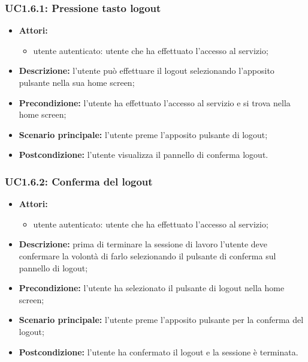 \subsubsection{UC1.6.1: Pressione tasto logout}
\begin{itemize}
	\item \textbf{Attori:}
	\begin{itemize}
		\item utente autenticato: utente che ha effettuato l'accesso al servizio;
	\end{itemize}
	\item \textbf{Descrizione:} l'utente può effettuare il logout selezionando l'apposito pulsante nella sua home screen;
	\item \textbf{Precondizione:} l'utente ha effettuato l'accesso al servizio e si trova nella home screen;
	\item \textbf{Scenario principale:} l'utente preme l'apposito pulsante di logout;
	\item \textbf{Postcondizione:} l'utente visualizza il pannello di conferma logout.
\end{itemize}

\subsubsection{UC1.6.2: Conferma del logout}
\begin{itemize}
	\item \textbf{Attori:}
	\begin{itemize}
		\item utente autenticato: utente che ha effettuato l'accesso al servizio;
	\end{itemize}
	\item \textbf{Descrizione:} prima di terminare la sessione di lavoro l'utente deve confermare la volontà di farlo selezionando il pulsante di conferma sul pannello di logout;
	\item \textbf{Precondizione:} l'utente ha selezionato il pulsante di logout nella home screen;
	\item \textbf{Scenario principale:} l'utente preme l'apposito pulsante per la conferma del logout;
	\item \textbf{Postcondizione:} l'utente ha confermato il logout e la sessione è terminata.
\end{itemize}

\pagebreak



